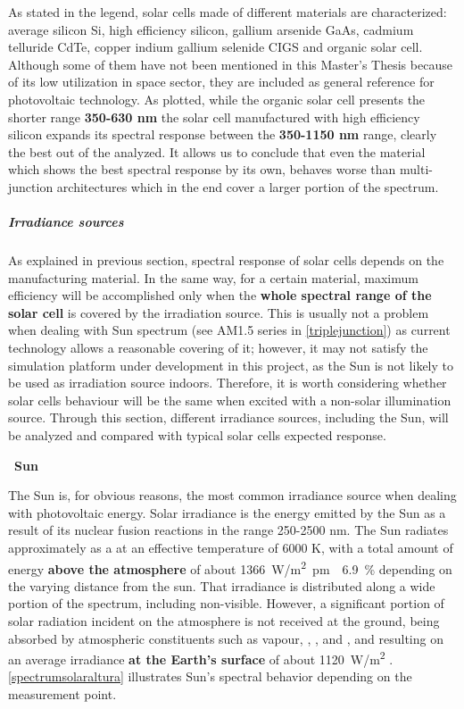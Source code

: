 				As stated in the legend, solar cells made of different materials are characterized: average silicon Si, high efficiency silicon, gallium arsenide GaAs, cadmium telluride CdTe, copper indium gallium selenide CIGS and organic solar cell. Although some of them have not been mentioned in this Master's Thesis because of its low utilization in space sector, they are included as general reference for photovoltaic technology. As plotted, while the organic solar cell presents the shorter range \textbf{350-630 nm} the solar cell manufactured with high efficiency silicon expands its spectral response between the \textbf{350-1150 nm} range, clearly the best out of the analyzed. It allows us to conclude that even the material which shows the best spectral response by its own, behaves worse than multi-junction architectures which in the end cover a larger portion of the spectrum.
			


	\subparagraph{Irradiance sources} \label{irradsources}
	
	As explained in previous section, spectral response of solar cells depends on the manufacturing material. In the same way, for a certain material, maximum efficiency will be accomplished only when the \textbf{whole spectral range of the solar cell} is covered by the irradiation source. This is usually not a problem when dealing with Sun spectrum (see AM1.5 series in \autoref{triplejunction}) as current technology allows a reasonable covering of it; however, it may not satisfy the simulation platform under development in this project, as the Sun is not likely to be used as irradiation source indoors. Therefore, it is worth considering whether solar cells behaviour will be the same when excited with a non-solar illumination source. Through this section, different irradiance sources, including the Sun, will be analyzed and compared with typical solar cells expected response.
	
			 \textbullet\ \textbf{Sun}

		The Sun is, for obvious reasons, the most common irradiance source when dealing with photovoltaic energy. Solar irradiance is the energy emitted by the Sun as a result of its nuclear fusion reactions in the range 250-2500 nm. The Sun radiates approximately as a  at an effective temperature of 6000 K, with a total amount of energy \textbf{above the atmosphere} of about \SI[separate-uncertainty = true]{1366}{W/m^2 \pm{} \num{6.9}\percent} depending on the varying distance from the sun. That irradiance is distributed along a wide portion of the spectrum, including non-visible. However, a significant portion of solar radiation incident on the atmosphere is not received at the ground, being absorbed by atmospheric constituents such as  vapour, , , and , and resulting on an average irradiance \textbf{at the Earth's surface} of about \SI{1120}{ W/m^2} \cite{sunspectral}. \autoref{spectrumsolaraltura} illustrates Sun's spectral behavior depending on the measurement point. 
		
